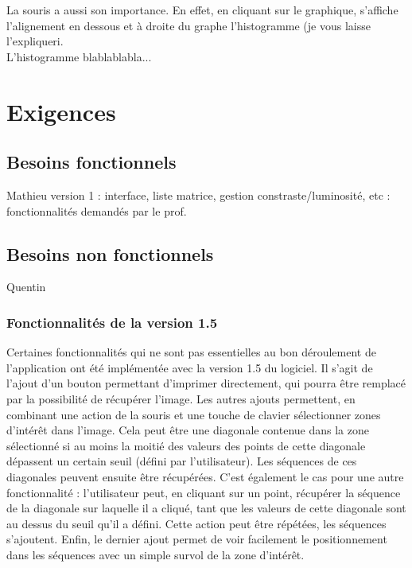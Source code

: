 \documentclass{report}
\begin{document}
La souris a aussi son importance. En effet, en cliquant sur le graphique, s'affiche l'alignement en dessous et à droite du graphe l'histogramme (je vous laisse l'expliquer^^).\\
L'histogramme blablablabla...


\chapter{Exigences}
\section{Besoins fonctionnels}
Mathieu
version 1 : interface, liste matrice, gestion constraste/luminosité, etc : fonctionnalités demandés par le prof.

\section{Besoins non fonctionnels}
Quentin


\subsection{Fonctionnalités de la version 1.5}
Certaines fonctionnalités qui ne sont pas essentielles au bon déroulement de l'application ont été implémentée avec la version 1.5 du logiciel. Il s'agit de l'ajout d'un bouton permettant d'imprimer directement, qui pourra être remplacé par la possibilité de récupérer l'image. Les autres ajouts permettent, en combinant une action de la souris et une touche de clavier sélectionner zones d'intérêt dans l'image. Cela peut être une diagonale contenue dans la zone sélectionné si au moins la moitié des valeurs des points de cette diagonale dépassent un certain seuil (défini par l'utilisateur). Les séquences de ces diagonales peuvent ensuite être récupérées. C'est également le cas pour une autre fonctionnalité : l'utilisateur peut, en cliquant sur un point, récupérer la séquence de la diagonale sur laquelle il a cliqué, tant que les valeurs de cette diagonale sont au dessus du seuil qu'il a défini. Cette action peut être répétées, les séquences s'ajoutent. Enfin, le dernier ajout permet de voir facilement le positionnement dans les séquences avec un simple survol de la zone d'intérêt.
\end{document}
